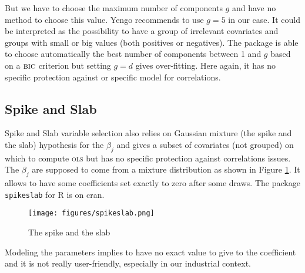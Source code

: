 \documentclass[12pt,a4paper]{report}
\begin{document}
			 But we have to choose the maximum number of components $g$ and have no method to choose this value. Yengo recommends to use $g=5$ in our case. It could be interpreted as the possibility to have a group of irrelevant covariates and groups with small or big values (both positives or negatives). The package is able to choose automatically the best number of components between 1 and $g$ based on a $\mbox{{\sc bic}}$ criterion but setting $g=d$ gives over-fitting.
	 Here again, it has no specific protection against or specific model for correlations. 
		\subsection{Spike and Slab}			%

			Spike and Slab variable selection \cite{ishwaran2005spike} also relies on Gaussian mixture (the spike and the slab) hypothesis for the $\beta_j$ and gives a subset of covariates (not grouped) on which to compute \textsc{ols} but has no specific protection against correlations issues.  The $\beta_j$ are supposed to come from a mixture distribution as shown in Figure \ref{spikeslab}. It allows to have some coefficients set exactly to zero after some draws. The package {\tt spikeslab} for R is on {\sc cran}. \\
			
\begin{figure}[h!]
	\centering
	\texttt{[image: figures/spikeslab.png]} 
	\caption{The spike and the slab}\label{spikeslab}
\end{figure}		
		
		Modeling the parameters implies to have no exact value to give to the coefficient and it is not really user-friendly, especially in our industrial context. %
		
		\FloatBarrier
	
		
		
		
			
\end{document}
